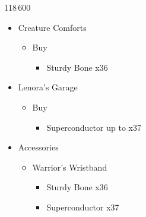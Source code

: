 \begin{shop}{118\,600}
\begin{itemize}
\begin{itemize}
			\end{itemize}
		\item Creature Comforts
			\begin{itemize}
				\item Buy
					\begin{itemize}
						\item Sturdy Bone x36
					\end{itemize}
			\end{itemize}
		\item Lenora's Garage
			\begin{itemize}
				\item Buy
					\begin{itemize}
						\item Superconductor up to x37
					\end{itemize}
			\end{itemize}									
	\end{itemize}
\end{shop}

\begin{upgrade}
	\begin{itemize}
		\item Accessories
			\begin{itemize}
				\item Warrior's Wristband
					\begin{itemize}
						\item Sturdy Bone x36
						\item Superconductor x37
					\end{itemize}
			\end{itemize}
	\end{itemize}	
\end{upgrade}
	
